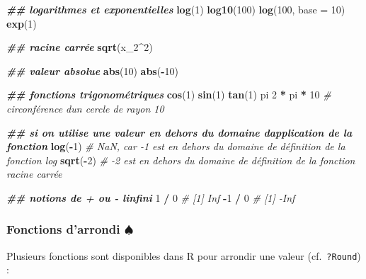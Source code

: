 \documentclass[
]{book}
\newenvironment{Shaded}{\begin{snugshade}}{\end{snugshade}}
\newcommand{\AttributeTok}[1]{\textcolor[rgb]{0.13,0.29,0.53}{#1}}
\newcommand{\CommentTok}[1]{\textcolor[rgb]{0.56,0.35,0.01}{\textit{#1}}}
\newcommand{\DecValTok}[1]{\textcolor[rgb]{0.00,0.00,0.81}{#1}}
\newcommand{\DocumentationTok}[1]{\textcolor[rgb]{0.56,0.35,0.01}{\textbf{\textit{#1}}}}
\newcommand{\FunctionTok}[1]{\textcolor[rgb]{0.13,0.29,0.53}{\textbf{#1}}}
\newcommand{\NormalTok}[1]{#1}
\newcommand{\SpecialCharTok}[1]{\textcolor[rgb]{0.81,0.36,0.00}{\textbf{#1}}}
\begin{document}
\begin{Shaded}
\begin{Highlighting}[]
\DocumentationTok{\#\# logarithmes et exponentielles}
\FunctionTok{log}\NormalTok{(}\DecValTok{1}\NormalTok{)}
\FunctionTok{log10}\NormalTok{(}\DecValTok{100}\NormalTok{)}
\FunctionTok{log}\NormalTok{(}\DecValTok{100}\NormalTok{, }\AttributeTok{base =} \DecValTok{10}\NormalTok{)}
\FunctionTok{exp}\NormalTok{(}\DecValTok{1}\NormalTok{)}

\DocumentationTok{\#\# racine carrée}
\FunctionTok{sqrt}\NormalTok{(x\_2}\SpecialCharTok{\^{}}\DecValTok{2}\NormalTok{)}

\DocumentationTok{\#\# valeur absolue}
\FunctionTok{abs}\NormalTok{(}\DecValTok{10}\NormalTok{)}
\FunctionTok{abs}\NormalTok{(}\SpecialCharTok{{-}}\DecValTok{10}\NormalTok{)}

\DocumentationTok{\#\# fonctions trigonométriques}
\FunctionTok{cos}\NormalTok{(}\DecValTok{1}\NormalTok{)}
\FunctionTok{sin}\NormalTok{(}\DecValTok{1}\NormalTok{)}
\FunctionTok{tan}\NormalTok{(}\DecValTok{1}\NormalTok{)}
\NormalTok{pi}
\DecValTok{2} \SpecialCharTok{*}\NormalTok{ pi }\SpecialCharTok{*} \DecValTok{10} \CommentTok{\# circonférence d\textquotesingle{}un cercle de rayon 10}

\DocumentationTok{\#\# si on utilise une valeur en dehors du domaine d\textquotesingle{}application de la fonction}
\FunctionTok{log}\NormalTok{(}\SpecialCharTok{{-}}\DecValTok{1}\NormalTok{) }\CommentTok{\# NaN, car {-}1 est en dehors du domaine de définition de la fonction log}
\FunctionTok{sqrt}\NormalTok{(}\SpecialCharTok{{-}}\DecValTok{2}\NormalTok{) }\CommentTok{\# {-}2 est en dehors du domaine de définition de la fonction racine carrée}

\DocumentationTok{\#\# notions de + ou {-} l\textquotesingle{}infini}
\DecValTok{1} \SpecialCharTok{/} \DecValTok{0} \CommentTok{\# [1] Inf}
\SpecialCharTok{{-}}\DecValTok{1} \SpecialCharTok{/} \DecValTok{0} \CommentTok{\# [1] {-}Inf}
\end{Highlighting}
\end{Shaded}

\subsubsection{\texorpdfstring{Fonctions d'arrondi \(\spadesuit\)}{Fonctions d'arrondi \textbackslash spadesuit}}\label{fonctions-darrondi-spadesuit}

Plusieurs fonctions sont disponibles dans R pour arrondir une valeur (cf.~\texttt{?Round}) :
\end{document}
